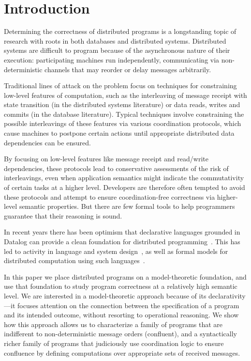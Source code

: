 \section{Introduction}
Determining the correctness of distributed programs is a longstanding topic of research with roots in both databases and distributed systems.  Distributed systems are difficult to program because of the asynchronous nature of their execution: participating machines run independently, communicating via non-deterministic channels that may reorder or delay messages arbitrarily.  

Traditional lines of attack on the problem focus on techniques for constraining low-level features of computation, such as the interleaving of message receipt with state transition (in the distributed systems literature) or data reads, writes and commits (in the database literature).  Typical techniques involve constraining the possible interleavings of these features via various coordination protocols, which cause machines to postpone certain actions until appropriate distributed data dependencies can be ensured.

By focusing on low-level features like message receipt and read/write dependencies, these protocols lead to conservative assessments of the risk of interleavings, even when application semantics might indicate the commutativity of certain tasks at a higher level. Developers are therefore often tempted to avoid these protocols and attempt to ensure coordination-free correctness via higher-level semantic properties.  But there are few formal tools to help programmers guarantee that their reasoning is sound.

In recent years there has been optimism that declarative languages grounded in Datalog can provide a clean foundation for distributed programming~\cite{declarative-imperative}.  This has led to activity in language and system design~\cite{declarative-distributed-languages}, as well as formal models for distributed computation using such languages~\cite{relational-transducers,navarro-oper-sem,card-abstraction}.

In this paper we place distributed programs on a model-theoretic foundation, and use that foundation to study program correctness at a relatively high semantic level.  We are interested in a model-theoretic approach because of its declarativity---it focuses attention on the connection between the specification of a program and its intended outcome, without resorting to operational reasoning.  We show how this approach allows us to characterize a family of programs that are indifferent to non-deterministic message orders (confluent), and a syntactically richer family of programs that judiciously use coordination logic to ensure confluence by defining computations over appropriate sets of received messages.

